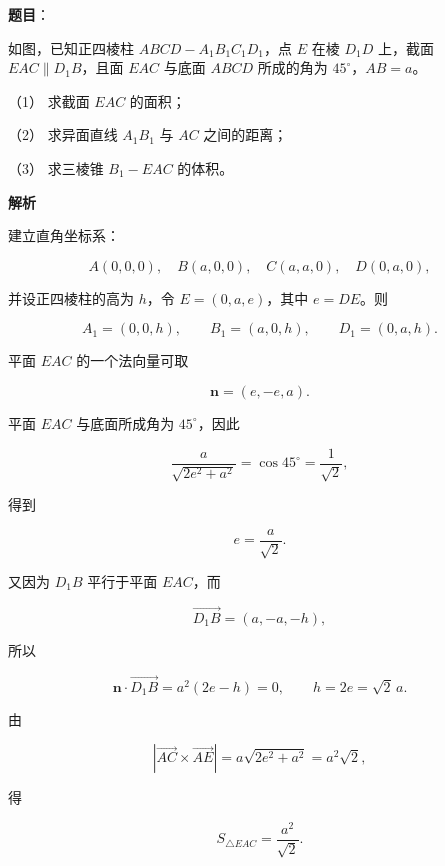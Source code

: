 \begin{answer}

\textbf{题目}：

如图，已知正四棱柱 $ABCD-A_1B_1C_1D_1$，点 $E$ 在棱 $D_1D$ 上，截面 $EAC\parallel D_1B$，且面 $EAC$ 与底面 $ABCD$ 所成的角为 $45^\circ$，$AB=a$。

（1） 求截面 $EAC$ 的面积；

（2） 求异面直线 $A_1B_1$ 与 $AC$ 之间的距离；

（3） 求三棱锥 $B_1-EAC$ 的体积。
\nopagebreak[4]
\begin{center}\end{center}
\nopagebreak[4]
\textbf{解析}

建立直角坐标系：

\nopagebreak[4]
\[
A(0,0,0),\quad B(a,0,0),\quad C(a,a,0),\quad D(0,a,0),
\]

并设正四棱柱的高为 $h$，令 $E=(0,a,e)$，其中 $e=DE$。则

\nopagebreak[4]
\[
A_1=(0,0,h),\qquad B_1=(a,0,h),\qquad D_1=(0,a,h).
\]

平面 $EAC$ 的一个法向量可取

\nopagebreak[4]
\[
\mathbf n=(e,-e,a).
\]

平面 $EAC$ 与底面所成角为 $45^\circ$，因此

\nopagebreak[4]
\[
\frac{a}{\sqrt{2e^2+a^2}}=\cos45^\circ=\frac1{\sqrt2},
\]

得到

\nopagebreak[4]
\[
e=\frac a{\sqrt2}.
\]

又因为 $D_1B$ 平行于平面 $EAC$，而

\nopagebreak[4]
\[
\overrightarrow{D_1B}=(a,-a,-h),
\]

所以

\nopagebreak[4]
\[
\mathbf n\cdot\overrightarrow{D_1B}
=a^2(2e-h)=0,
\qquad h=2e=\sqrt2\,a.
\]


由

\nopagebreak[4]
\[
\left|\overrightarrow{AC}\times\overrightarrow{AE}\right|
=a\sqrt{2e^2+a^2}=a^2\sqrt2,
\]

得

\nopagebreak[4]
\[
S_{\triangle EAC}=\frac{a^2}{\sqrt2}.
\]


\end{answer}
